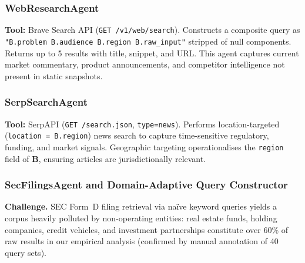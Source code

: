 \documentclass[preprint,12pt]{elsarticle}
\newcommand{\B}{\mathbf{B}}
\begin{document}
\subsubsection{WebResearchAgent}

\textbf{Tool:} Brave Search API (\texttt{GET /v1/web/search}). Constructs a
composite query as \texttt{"{B.problem} {B.audience} {B.region} {B.raw\_input}"}
stripped of null components. Returns up to 5 results with title, snippet, and
URL. This agent captures current market commentary, product announcements, and
competitor intelligence not present in static snapshots.

\subsubsection{SerpSearchAgent}

\textbf{Tool:} SerpAPI (\texttt{GET /search.json}, \texttt{type=news}). Performs
location-targeted (\texttt{location = B.region}) news search to capture
time-sensitive regulatory, funding, and market signals. Geographic targeting
operationalises the \texttt{region} field of $\B$, ensuring articles are
jurisdictionally relevant.

\subsubsection{SecFilingsAgent and Domain-Adaptive Query Constructor}
\label{sec:sec}

\textbf{Challenge.} SEC Form~D filing retrieval via na\"ive keyword queries yields
a corpus heavily polluted by non-operating entities: real estate funds, holding
companies, credit vehicles, and investment partnerships constitute over 60\% of
raw results in our empirical analysis (confirmed by manual annotation of 40 query
sets).
\end{document}
